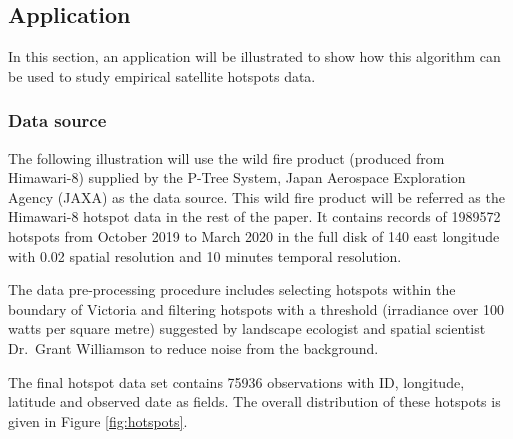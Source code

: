 \hypertarget{application}{%
\subsection{Application}\label{application}}

In this section, an application will be illustrated to show how this
algorithm can be used to study empirical satellite hotspots data.

\hypertarget{data-source}{%
\subsubsection{Data source}\label{data-source}}

The following illustration will use the wild fire product (produced from
Himawari-8) supplied by the P-Tree System, Japan Aerospace Exploration
Agency (JAXA) \citeyearpar{jaxa} as the data source. This wild fire
product will be referred as the Himawari-8 hotspot data in the rest of
the paper. It contains records of 1989572 hotspots from October 2019 to
March 2020 in the full disk of 140 \textdegree east longitude with 0.02
\textdegree spatial resolution and 10 minutes temporal resolution.

The data pre-processing procedure includes selecting hotspots within the
boundary of Victoria and filtering hotspots with a threshold (irradiance
over 100 watts per square metre) suggested by landscape ecologist and
spatial scientist Dr.~Grant Williamson \citeyearpar{hotspots} to reduce
noise from the background.

The final hotspot data set contains 75936 observations with ID,
longitude, latitude and observed date as fields. The overall
distribution of these hotspots is given in Figure \ref{fig:hotspots}.

